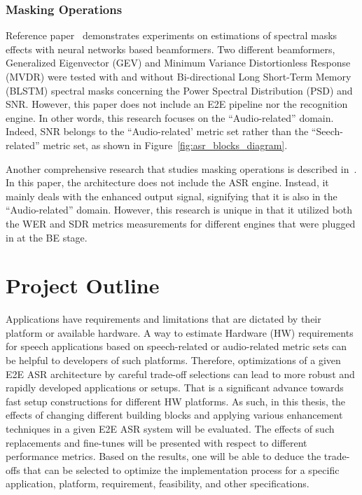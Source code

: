 \subsubsection{Masking Operations}
Reference paper~\cite{7471664} demonstrates experiments on estimations of spectral masks effects
with neural networks based beamformers.
Two different beamformers,  Generalized Eigenvector (GEV)
and Minimum Variance Distortionless Response (MVDR) were tested with and without Bi-directional Long Short-Term Memory (BLSTM)
spectral masks concerning the Power Spectral Distribution (PSD)
and SNR.
However, this paper does not include an E2E pipeline nor the recognition engine.
In other words, this research focuses on the ``Audio-related'' domain.
Indeed, SNR belongs to the
``Audio-related' metric set rather than the
``Seech-related'' metric set,
as shown in Figure~\ref{fig:asr_blocks_diagram}.
\bigskip

Another comprehensive research 
that studies masking operations
is described in~\cite{8466865}.
In this paper, the architecture does not include
the ASR engine. 
Instead, it mainly deals with the enhanced output signal,
signifying that it is also in the ``Audio-related'' domain.
However, this research is unique in that
it utilized both the WER and SDR metrics measurements
for different engines that were plugged in at the BE stage.



\section{Project Outline}
Applications have requirements and limitations
that are dictated by their platform or available hardware.
A way to estimate Hardware (HW) requirements for speech
applications based on speech-related or audio-related metric sets
can be helpful to developers of such platforms.
Therefore, optimizations of a given E2E ASR architecture by careful
trade-off selections can lead to more robust and rapidly
developed applications or setups.
That is a significant advance towards fast setup constructions for different HW platforms.
As such, in this thesis, the effects of changing different
building blocks and applying various enhancement techniques
in a given E2E ASR system will be evaluated.
The effects of such replacements and
fine-tunes will be presented with respect to different
performance metrics. Based on the results, one will be able to deduce the trade-offs
that can be selected to optimize the implementation process for a specific
application, platform, requirement, feasibility, and other specifications.

